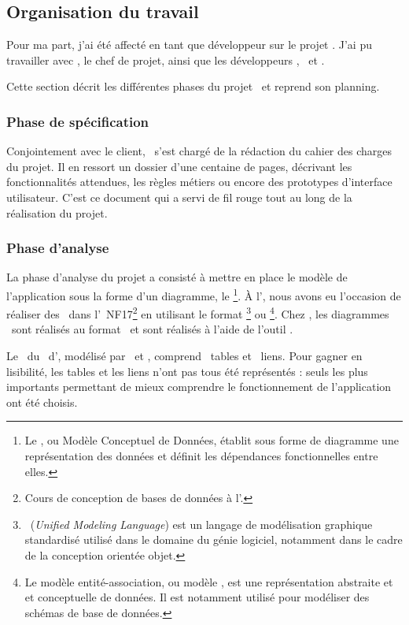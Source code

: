 \subsection{Organisation du travail}
\label{section:eyrolles_organisation}

Pour ma part, j'ai été affecté en tant que développeur sur le projet \aey. J'ai pu travailler avec \acohen, le chef de projet, ainsi que les développeurs \ahamon, \aweistroff\ et \abachelet. 

Cette section décrit les différentes phases du projet \aey\ et reprend son planning.


\subsubsection{Phase de spécification}

Conjointement avec le client, \acohen\ s'est chargé de la rédaction du cahier des charges du projet. Il en ressort un dossier d'une centaine de pages, décrivant les fonctionnalités attendues, les règles métiers ou encore des prototypes d'interface utilisateur. C'est ce document qui a servi de fil rouge tout au long de la réalisation du projet.


\subsubsection{Phase d'analyse}

La phase d'analyse du projet a consisté à mettre en place le modèle de l'application sous la forme d'un diagramme, le \emph{\amcd}\footnote{Le \amcd, ou Modèle Conceptuel de Données, établit sous forme de diagramme une représentation des données et définit les dépendances fonctionnelles entre elles.}. À l'\autc, nous avons eu l'occasion de réaliser des \amcds\ dans l'\auv\ NF17\footnote{Cours de conception de bases de données à l'\autc.} en utilisant le format \auml\footnote{\auml\ (\textit{Unified Modeling Language}) est un langage de modélisation graphique standardisé utilisé dans le domaine du génie logiciel, notamment dans le cadre de la conception orientée objet.\cite{uml}} ou \aea\footnote{Le modèle entité-association, ou modèle \aea, est une représentation abstraite et et conceptuelle de données. Il est notamment utilisé pour modéliser des schémas de base de données.\cite{ea}}. Chez \asl, les diagrammes \amcds\ sont réalisés au format \aea\ et sont réalisés à l'aide de l'outil \amysqlwb.

Le \amcd\ du \alotdeux\ d'\aey, modélisé par \acohen\ et \ahamon, comprend ~tables et ~liens. Pour gagner en lisibilité, les tables et les liens n'ont pas tous été représentés : seuls les plus importants permettant de mieux comprendre le fonctionnement de l'application ont été choisis.


